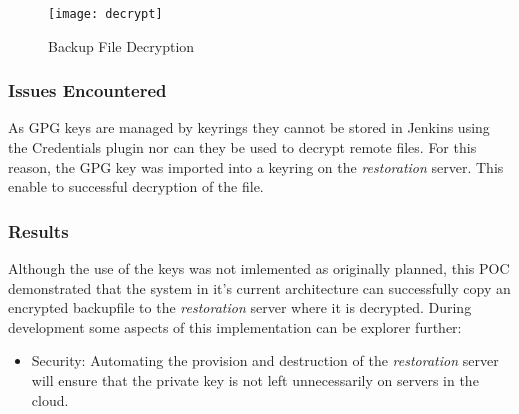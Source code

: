	\begin{figure}[H]
		\caption{Backup File Decryption}
		\centering
		\texttt{[image: decrypt]}
		\label{fig:decrypt}
	\end{figure}
	
	\subsubsection{Issues Encountered}
	As GPG keys are managed by keyrings they cannot be stored in Jenkins using the Credentials plugin nor can they be used to decrypt remote files. For this reason, the GPG key was imported into a keyring on the \textit{restoration} server. This enable to successful decryption of the file.
	
	\subsubsection{Results}
	Although the use of the keys was not imlemented as originally planned, this POC demonstrated that the system in it's current architecture can successfully copy an encrypted backupfile to the \textit{restoration} server where it is decrypted. During development some aspects of this implementation can be explorer further:
	\begin{itemize}
		\item Security: Automating the provision and destruction of the \textit{restoration} server will ensure that the private key is not left unnecessarily on servers in the cloud. 
	\end{itemize}
	
	